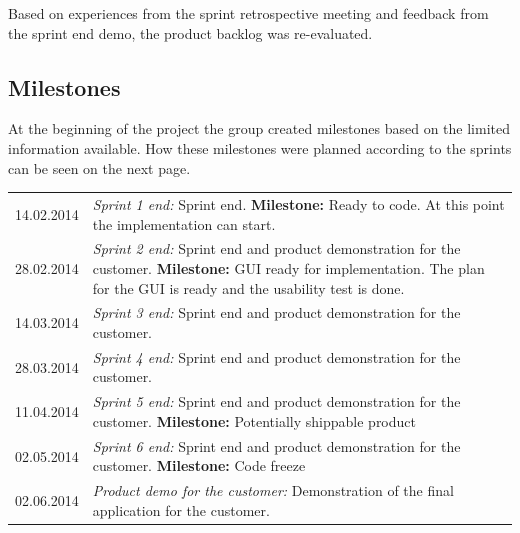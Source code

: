 Based on experiences from the sprint retrospective meeting and feedback from the sprint end demo, the product backlog was re-evaluated.


\subsection{Milestones}
At the beginning of the project the group created milestones based on the limited information available. How these milestones were planned according to the sprints can be seen on the next page.

\begin{table}[H]
\begin{tabular}{p{2cm}p{11cm}}
14.02.2014 & \emph{Sprint 1 end:} Sprint end. \textbf{Milestone:} Ready to code. At this point the implementation can start. \\
28.02.2014 & \emph{Sprint 2 end:} Sprint end and product demonstration for the customer. \textbf{Milestone:} GUI ready for implementation. The plan for the GUI is ready and the usability test is done. \\
14.03.2014 & \emph{Sprint 3 end:} Sprint end and product demonstration for the customer. \\
28.03.2014 & \emph{Sprint 4 end:} Sprint end and product demonstration for the customer. \\
11.04.2014 & \emph{Sprint 5 end:} Sprint end and product demonstration for the customer. \textbf{Milestone:} Potentially shippable product \\
02.05.2014 & \emph{Sprint 6 end:} Sprint end and product demonstration for the customer. \textbf{Milestone:} Code freeze \\
02.06.2014 & \emph{Product demo for the customer:} Demonstration of the final application for the customer. \\
\end{tabular}
\end{table}



